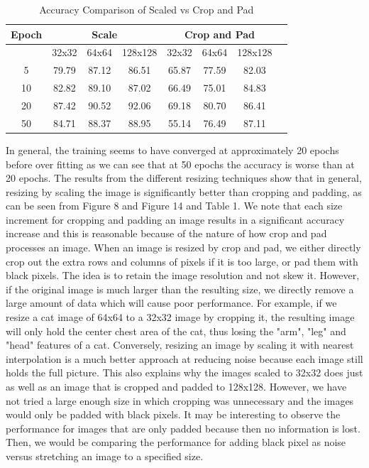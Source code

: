\documentclass{article}
\begin{document}
\begin{table}[ht]
	\caption{Accuracy Comparison of Scaled vs Crop and Pad} %
	\centering %
	\begin{tabular}{c c c c c c c c} %
		\hline\hline %
		
		Epoch &  \multicolumn{3}{c}{Scale} & \multicolumn{3}{c}{Crop and Pad}\\
		\hline
		
		{} & 32x32 & 64x64 & 128x128 & 32x32 & 64x64 & 128x128 \\ [0.5ex] %
		\hline %
		5 & 79.79 & 87.12 & 86.51 & 65.87 & 77.59 & 82.03\\
		10 & 82.82 & 89.10 & 87.02 & 66.49 & 75.01 & 84.83\\
		20 & 87.42 & 90.52 & 92.06 & 69.18 & 80.70 & 86.41\\
		50 & 84.71& 88.37 & 88.95 & 55.14 & 76.49 & 87.11\\ [1ex] %
		\hline %
	\end{tabular}
	\label{table:scale_cp} %
\end{table}
In general, the training seems to have converged at approximately 20 epochs before over fitting as we can see that at 50 epochs the accuracy is worse than at 20 epochs. 
The results from the different resizing techniques show that in general, resizing by scaling the image is significantly better than cropping and padding, as can be seen from Figure 8 and Figure 14 and Table 1. We note that each size increment for cropping and padding an image results in a significant accuracy increase and this is reasonable because of the nature of how crop and pad processes an image. When an image is resized by crop and pad, we either directly crop out the extra rows and columns of pixels if it is too large, or pad them with black pixels. The idea is to retain the image resolution and not skew it. However, if the original image is much larger than the resulting size, we directly remove a large amount of data which will cause poor performance. For example, if we resize a cat image of 64x64 to a 32x32 image by cropping it, the resulting image will only hold the center chest area of the cat, thus losing the "arm", "leg" and "head" features of a cat. Conversely, resizing an image by scaling it with nearest interpolation is a much better approach at reducing noise because each image still holds the full picture. This also explains why the images scaled to 32x32 does just as well as an image that is cropped and padded to 128x128. However, we have not tried a large enough size in which cropping was unnecessary and the images would only be padded with black pixels. It may be interesting to observe the performance for images that are only padded because then no information is lost. Then, we would be comparing the performance for adding black pixel as noise versus stretching an image to a specified size. 
\end{document}
